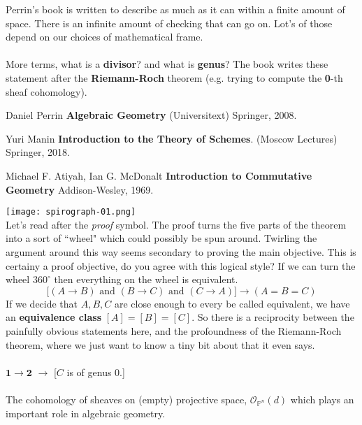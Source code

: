 \documentclass[12pt]{article}
\begin{document}
Perrin's book is written to describe as much as it can within a finite amount of space.  There is an infinite amount of checking that can go on.  Lot's of those depend on our choices of mathematical frame.  \\ \\
More terms, what is a \textbf{divisor}? and what is \textbf{genus}?  The book writes these statement after the \textbf{Riemann-Roch} theorem (e.g. trying to compute the \textbf{0}-th sheaf cohomology).  
\vfill



\begin{thebibliography}{}
\item Daniel Perrin \textbf{Algebraic Geometry} (Universitext) Springer, 2008.
\item Yuri Manin \textbf{Introduction to the Theory of Schemes}. (Moscow Lectures) Springer, 2018.
\item Michael F. Atiyah, Ian G. McDonalt \textbf{Introduction to Commutative Geometry} Addison-Wesley, 1969.

\end{thebibliography}
\texttt{[image: spirograph-01.png]} \\
\noindent Let's read after the \textit{proof} symbol.  The proof turns the five parts of the theorem into a sort of ``wheel" which could possibly be spun around.  Twirling the argument around this way seems secondary to proving the main objective.  This is certainy a proof objective, do you agree with this logical style? If we can turn the wheel $360^\circ$ then everything on the wheel is equivalent. 
$$ \Big[ (A \to B) \text{ and } (B \to C) \text{ and } (C \to A) \Big] \to (A=B=C)   $$ 
If we decide that $A, B, C$ are close enough to every be called equivalent, we have an \textbf{equivalence class} $[A] = [B] = [C]$.  So there is a reciprocity between the painfully obvious statements here, and the profoundness of the Riemann-Roch theorem, where we just want to know a tiny bit about that it even says.\\ \\
$\mathbf{1} \to \mathbf{2}$  \quad\quad\quad\quad\quad\quad{} $\to$ [$C$ is of genus $0$.] \\ \\
The cohomology of sheaves on (empty) projective space, $\mathcal{O}_{\mathbb{P}^n}(d)$ which plays an important role in algebraic geometry. \\ \\
\end{document}
